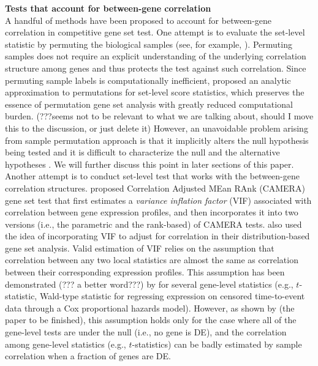 \documentclass[11pt, a4paper]{article}
\begin{document}
	  \textbf{Tests that account for between-gene correlation}\\
	  A handful of methods have been proposed to account for between-gene correlation in competitive gene set test. One attempt is to evaluate the set-level statistic by permuting the biological samples (see, for example, \cite{subramanian2005gene, efron2007testing}). Permuting samples does not require an explicit understanding of the underlying correlation structure among genes and thus protects the test against such correlation. Since permuting sample labels is computationally inefficient, \cite{zhou2013empirical} proposed an analytic approximation to permutations for set-level score statistics, which preserves the essence of permutation gene set analysis with greatly reduced computational burden. (???seems not to be relevant to what we are talking about, should I move this to the discussion, or just delete it)  However, an unavoidable problem arising from sample permutation approach is that it implicitly alters the null hypothesis being tested and it is difficult to characterize the null and the alternative hypotheses \citep{goeman2007analyzing, khatri2012ten, 
	  	wu2012camera}. We will further discuss this point in later sections of this paper. Another attempt is to conduct set-level test that works with the between-gene correlation structures. \cite{wu2012camera} proposed Correlation Adjusted MEan RAnk (CAMERA) gene set test that first estimates a \textit{variance inflation factor} (VIF) associated with correlation between gene expression profiles, and then incorporates it into two versions (i.e., the parametric and the rank-based) of CAMERA tests. \cite{yaari2013quantitative} also used the idea of incorporating VIF to adjust for correlation in their distribution-based gene set analysis. Valid estimation of VIF relies on the assumption that correlation between any two local statistics are almost the same as correlation between their corresponding expression profiles. This assumption has been demonstrated (??? a better word???) by \cite{barry2008statistical} for several gene-level statistics (e.g., $t$-statistic, Wald-type statistic for regressing expression on censored time-to-event data through a Cox proportional hazards model). However, as shown by (the paper to be finished), this assumption holds only for the case where all of the gene-level tests are under the null (i.e., no gene is DE), and the correlation among gene-level statistics (e.g., $t$-statistics) can be badly estimated by sample correlation when a fraction of genes are DE. 
\end{document}
